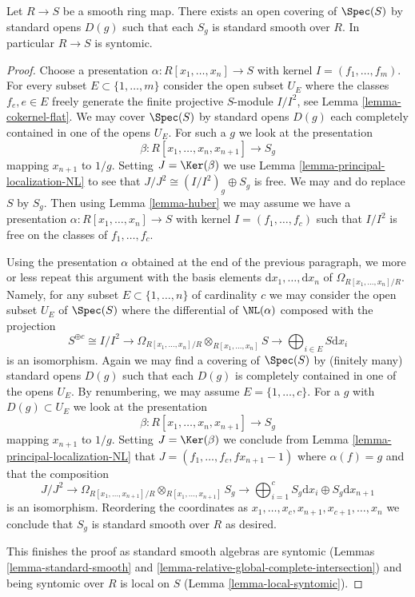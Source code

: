 \begin{lemma}
\label{lemma-smooth-syntomic}
Let $R \to S$ be a smooth ring map.
There exists an open covering of $\Spec(S)$ by
standard opens $D(g)$ such that each $S_g$ is standard smooth
over $R$. In particular $R \to S$ is syntomic.
\end{lemma}

\begin{proof}
Choose a presentation $\alpha : R[x_1, \ldots, x_n] \to S$
with kernel $I = (f_1, \ldots, f_m)$. For every subset
$E \subset \{1, \ldots, m\}$ consider the open
subset $U_E$ where the classes $f_e, e\in E$ freely generate
the finite projective $S$-module $I/I^2$, see Lemma \ref{lemma-cokernel-flat}.
We may cover $\Spec(S)$ by standard opens $D(g)$ each
completely contained in one of the opens $U_E$. For such a $g$
we look at the presentation
$$
\beta : R[x_1, \ldots, x_n, x_{n + 1}] \longrightarrow S_g
$$
mapping $x_{n + 1}$ to $1/g$. Setting $J = \Ker(\beta)$ we
use Lemma \ref{lemma-principal-localization-NL} to see that
$J/J^2 \cong (I/I^2)_g \oplus S_g$ is free.
We may and do replace $S$ by $S_g$. Then using
Lemma \ref{lemma-huber} we may assume we have a presentation
$\alpha : R[x_1, \ldots, x_n] \to S$ with kernel $I = (f_1, \ldots, f_c)$
such that $I/I^2$ is free on the classes of $f_1, \ldots, f_c$.

\medskip\noindent
Using the presentation $\alpha$ obtained at the end of the previous
paragraph, we more or less repeat this argument with
the basis elements $\text{d}x_1, \ldots, \text{d}x_n$
of $\Omega_{R[x_1, \ldots, x_n]/R}$.
Namely, for any subset $E \subset \{1, \ldots, n\}$ of cardinality $c$
we may consider the open subset $U_E$ of $\Spec(S)$ where
the differential of $\NL(\alpha)$ composed with the projection
$$
S^{\oplus c} \cong I/I^2
\longrightarrow
\Omega_{R[x_1, \ldots, x_n]/R} \otimes_{R[x_1, \ldots, x_n]} S
\longrightarrow
\bigoplus\nolimits_{i \in E} S\text{d}x_i
$$
is an isomorphism. Again we may find a covering of $\Spec(S)$
by (finitely many) standard opens $D(g)$ such that each $D(g)$
is completely contained in one of the opens $U_E$.
By renumbering, we may assume $E = \{1, \ldots, c\}$.
For a $g$ with $D(g) \subset U_E$ we look at the presentation
$$
\beta : R[x_1, \ldots, x_n, x_{n + 1}] \to S_g
$$
mapping $x_{n + 1}$ to $1/g$. Setting $J = \Ker(\beta)$
we conclude from Lemma \ref{lemma-principal-localization-NL}
that $J = (f_1, \ldots, f_c, fx_{n + 1} - 1)$ where $\alpha(f) = g$
and that the composition
$$
J/J^2 \longrightarrow
\Omega_{R[x_1, \ldots, x_{n + 1}]/R} \otimes_{R[x_1, \ldots, x_{n + 1}]} S_g
\longrightarrow
\bigoplus\nolimits_{i = 1}^c S_g\text{d}x_i \oplus S_g \text{d}x_{n + 1}
$$
is an isomorphism. Reordering the coordinates as
$x_1, \ldots, x_c, x_{n + 1}, x_{c + 1}, \ldots, x_n$
we conclude that $S_g$ is standard smooth over $R$ as desired.

\medskip\noindent
This finishes the proof as standard smooth algebras are syntomic
(Lemmas \ref{lemma-standard-smooth} and
\ref{lemma-relative-global-complete-intersection})
and being syntomic over $R$ is local on $S$
(Lemma \ref{lemma-local-syntomic}).
\end{proof}

